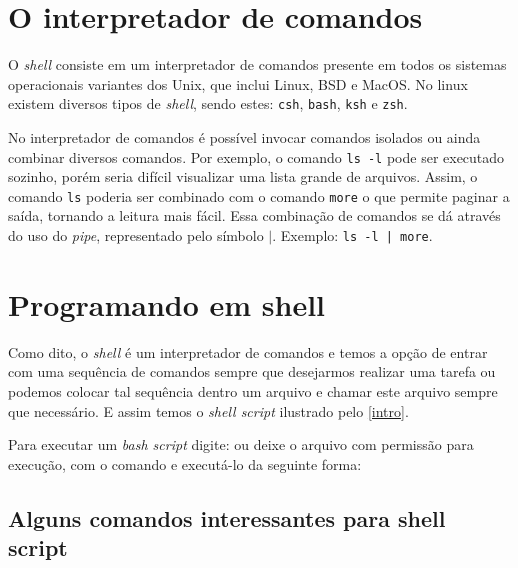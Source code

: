 \documentclass[11pt]{../classes/ifscarticle}
\begin{document}

\shell

\section{O interpretador de comandos}

O \textit{shell} consiste em um interpretador de comandos presente em todos os sistemas operacionais variantes dos Unix, que inclui Linux, BSD e MacOS. No linux existem diversos tipos de \textit{shell}, sendo estes: \texttt{csh}, \texttt{bash}, \texttt{ksh} e \texttt{zsh}. 

No interpretador de comandos é possível invocar comandos isolados ou ainda combinar diversos comandos. Por exemplo, o comando \texttt{ls -l} pode ser executado sozinho, porém seria difícil visualizar uma lista grande de arquivos. Assim, o comando \texttt{ls} poderia ser combinado com o comando \texttt{more} o que permite paginar a saída, tornando a leitura mais fácil. Essa combinação de comandos se dá através do uso do \textit{pipe}, representado pelo símbolo $|$. Exemplo: \texttt{ls -l | more}.

\section{Programando em shell}

Como dito, o \textit{shell} é um interpretador de comandos e temos a opção de entrar com uma sequência de comandos sempre que desejarmos realizar uma tarefa ou podemos colocar tal sequência dentro um arquivo e chamar este arquivo sempre que necessário. E assim temos o \textit{shell script} ilustrado pelo \autoref{intro}.


\begin{tip}
	Para executar um \textit{bash script} digite:  ou deixe o arquivo com permissão para execução, com o comando  e executá-lo da seguinte forma: 
\end{tip}

\subsection{Alguns comandos interessantes para shell script}
\end{document}
